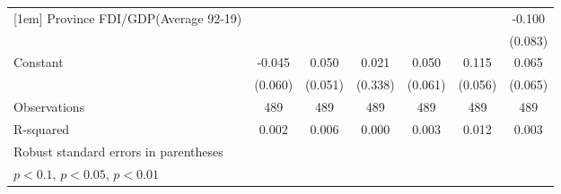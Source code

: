 \documentclass[]{article}
\begin{document}
\begin{table}
\begin{adjustbox}{width=\columnwidth,center}
{\begin{tabular}{l*{6}{c}}
[1em]
Province FDI/GDP(Average 92-19)&                  &                  &                  &                  &                  &   -0.100         \\
                &                  &                  &                  &                  &                  &  (0.083)         \\
[1em]
Constant        &   -0.045         &    0.050         &    0.021         &    0.050         &    0.115\sym{*}  &    0.065         \\
                &  (0.060)         &  (0.051)         &  (0.338)         &  (0.061)         &  (0.056)         &  (0.065)         \\
\hline
Observations    &  489  &  489   &  489     &  489        &  489      &  489  \\
R-squared       &    0.002         &    0.006         &    0.000         &    0.003         &    0.012         &    0.003         \\
\hline\hline
\multicolumn{7}{l}{\footnotesize Robust standard errors in parentheses}\\
\multicolumn{7}{l}{\footnotesize \sym{*} \(p<0.1\), \sym{**} \(p<0.05\), \sym{***} \(p<0.01\)}\\
\end{tabular}
}





\end{adjustbox}

\end{table}
\end{document}
